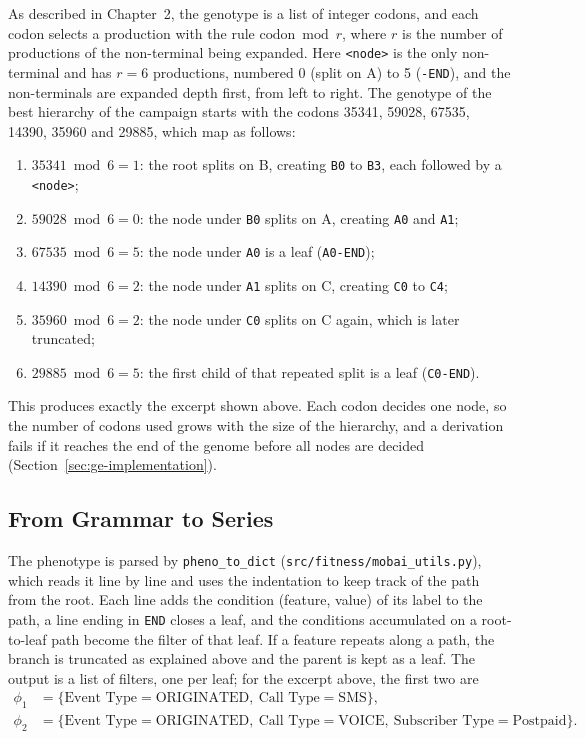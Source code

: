 As described in Chapter~2, the genotype is a list of integer codons, and each codon selects a production with the rule $\text{codon} \bmod r$, where $r$ is the number of productions of the non-terminal being expanded.
Here \texttt{<node>} is the only non-terminal and has $r = 6$ productions, numbered 0 (split on A) to 5 (\texttt{-END}), and the non-terminals are expanded depth first, from left to right.
The genotype of the best hierarchy of the campaign starts with the codons 35341, 59028, 67535, 14390, 35960 and 29885, which map as follows:
\begin{enumerate}
    \item $35341 \bmod 6 = 1$: the root splits on B, creating \texttt{B0} to \texttt{B3}, each followed by a \texttt{<node>};
    \item $59028 \bmod 6 = 0$: the node under \texttt{B0} splits on A, creating \texttt{A0} and \texttt{A1};
    \item $67535 \bmod 6 = 5$: the node under \texttt{A0} is a leaf (\texttt{A0-END});
    \item $14390 \bmod 6 = 2$: the node under \texttt{A1} splits on C, creating \texttt{C0} to \texttt{C4};
    \item $35960 \bmod 6 = 2$: the node under \texttt{C0} splits on C again, which is later truncated;
    \item $29885 \bmod 6 = 5$: the first child of that repeated split is a leaf (\texttt{C0-END}).
\end{enumerate}
This produces exactly the excerpt shown above.
Each codon decides one node, so the number of codons used grows with the size of the hierarchy, and a derivation fails if it reaches the end of the genome before all nodes are decided (Section~\ref{sec:ge-implementation}).

\subsection{From Grammar to Series}
\label{sec:grammar-to-series}

The phenotype is parsed by \texttt{pheno\_to\_dict} (\texttt{src/fitness/mobai\_utils.py}), which reads it line by line and uses the indentation to keep track of the path from the root.
Each line adds the condition (feature, value) of its label to the path, a line ending in \texttt{END} closes a leaf, and the conditions accumulated on a root-to-leaf path become the filter of that leaf.
If a feature repeats along a path, the branch is truncated as explained above and the parent is kept as a leaf.
The output is a list of filters, one per leaf; for the excerpt above, the first two are
\begin{align*}
    \phi_1 &= \{\text{Event Type} = \text{ORIGINATED},\ \text{Call Type} = \text{SMS}\},\\
    \phi_2 &= \{\text{Event Type} = \text{ORIGINATED},\ \text{Call Type} = \text{VOICE},\ \text{Subscriber Type} = \text{Postpaid}\}.
\end{align*}

